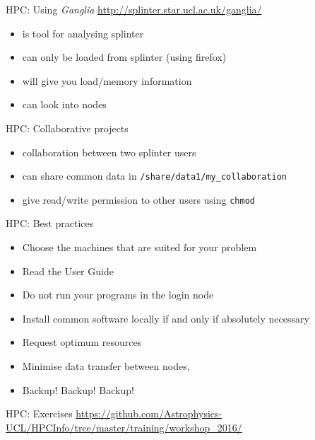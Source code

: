 \documentclass{beamer}
\begin{document}
\begin{frame}{HPC: Using \emph{Ganglia}}
	\url{http://splinter.star.ucl.ac.uk/ganglia/}

	\begin{itemize}
		\item is tool for analysing splinter
		\item can only be loaded from splinter (using firefox)
		\item will give you load/memory information
		\item can look into nodes
	\end{itemize}
\end{frame}

\begin{frame}{HPC: Collaborative projects}
	\begin{itemize}
		\item collaboration between two splinter users
		\item can share common data in \texttt{/share/data1/my\_collaboration}
		\item give read/write permission to other users using \texttt{chmod}
	\end{itemize}
\end{frame}


\begin{frame}{HPC: Best practices}
  \begin{itemize}
    \item Choose the machines that are suited for your problem
    \item Read the User Guide
    \item Do not run your programs in the login node
    \item Install common software locally if and only if absolutely necessary
    \item Request optimum resources
    \item Minimise data transfer between nodes,
    \item \alert{Backup! Backup! Backup!}
  \end{itemize}
\end{frame}

\begin{frame}{HPC: Exercises}
	\url{https://github.com/Astrophysics-UCL/HPCInfo/tree/master/training/workshop_2016/}
\end{frame}
\end{document}
